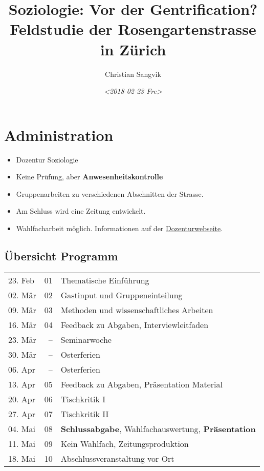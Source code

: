 \documentclass[11pt]{article}
\author{Christian Sangvik}
\date{\textit{<2018-02-23 Fre>}}
\title{Soziologie: Vor der Gentrification? Feldstudie der Rosengartenstrasse in Zürich}
\begin{document}
\maketitle
\tableofcontents


\section{Administration}
\label{sec-1}

\begin{itemize}
\item Dozentur Soziologie
\item Keine Prüfung, aber \textbf{Anwesenheitskontrolle}
\item Gruppenarbeiten zu verschiedenen Abschnitten der Strasse.
\item Am Schluss wird eine Zeitung entwickelt.
\item Wahlfacharbeit möglich. Informationen auf der \href{http://www.soziologie.arch.ethz.ch/de/}{Dozenturwebseite}.
\end{itemize}

\subsection{Übersicht Programm}
\label{sec-1-1}

\begin{center}
\begin{tabular}{lrl}
23. Feb & 01 & Thematische Einführung\\
02. Mär & 02 & Gastinput und Gruppeneinteilung\\
09. Mär & 03 & Methoden und wissenschaftliches Arbeiten\\
16. Mär & 04 & Feedback zu Abgaben, Interviewleitfaden\\
23. Mär & -- & Seminarwoche\\
30. Mär & -- & Osterferien\\
06. Apr & -- & Osterferien\\
13. Apr & 05 & Feedback zu Abgaben, Präsentation Material\\
20. Apr & 06 & Tischkritik I\\
27. Apr & 07 & Tischkritik II\\
04. Mai & 08 & \textbf{Schlussabgabe}, Wahlfachauswertung, \textbf{Präsentation}\\
11. Mai & 09 & Kein Wahlfach, Zeitungsproduktion\\
18. Mai & 10 & Abschlussveranstaltung vor Ort\\
\end{tabular}
\end{center}
\end{document}
